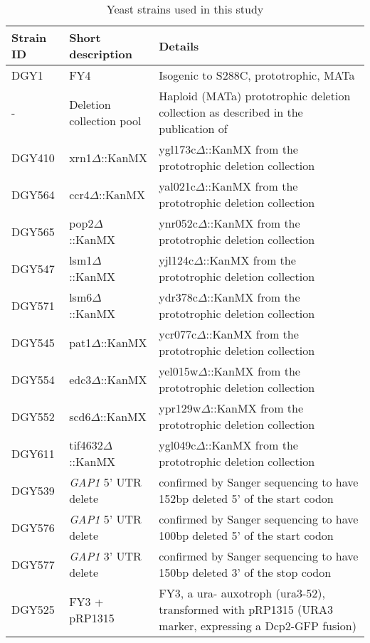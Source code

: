 \begin{table}%
\caption{Yeast strains used in this study}
\label{tab:strainsTable}
\begin{tabular}{l l p{}}
\toprule
Strain ID & Short description & Details \\
\midrule
DGY1 & FY4 & Isogenic to S288C, prototrophic, MATa \\
- & Deletion collection pool & Haploid (MATa) prototrophic deletion
collection as described in the publication of
\cite{vandersluis2014broad}\\
DGY410 &xrn1$\Delta$::KanMX &   ygl173c$\Delta$::KanMX from the prototrophic deletion collection \\
DGY564 &ccr4$\Delta$::KanMX &   yal021c$\Delta$::KanMX from the prototrophic deletion collection \\
DGY565 &pop2$\Delta$::KanMX &   ynr052c$\Delta$::KanMX from the prototrophic deletion collection \\
DGY547 &lsm1$\Delta$::KanMX &   yjl124c$\Delta$::KanMX from the prototrophic deletion collection \\
DGY571 &lsm6$\Delta$::KanMX &   ydr378c$\Delta$::KanMX from the prototrophic deletion collection \\
DGY545 &pat1$\Delta$::KanMX &   ycr077c$\Delta$::KanMX from the prototrophic deletion collection \\
DGY554 &edc3$\Delta$::KanMX &   yel015w$\Delta$::KanMX from the prototrophic deletion collection \\
DGY552 &scd6$\Delta$::KanMX &   ypr129w$\Delta$::KanMX from the prototrophic deletion collection \\
DGY611 &tif4632$\Delta$::KanMX &   ygl049c$\Delta$::KanMX from the prototrophic deletion collection \\
DGY539 & \textit{GAP1} 5' UTR delete & confirmed by Sanger sequencing to have 152bp deleted 5' of the start codon \\
DGY576 & \textit{GAP1} 5' UTR delete & confirmed by Sanger sequencing to have 100bp deleted 5' of the start codon \\
DGY577 & \textit{GAP1} 3' UTR delete & confirmed by Sanger sequencing to have 150bp deleted 3' of the stop codon \\
DGY525 & FY3 + pRP1315 & FY3, a ura- auxotroph (ura3-52), transformed with pRP1315 (URA3 marker, expressing a Dcp2-GFP fusion) \\
\bottomrule
\end{tabular}
\end{table}

